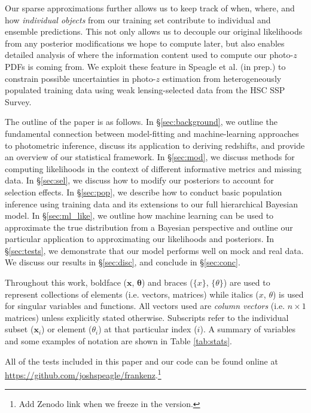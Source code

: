 \documentclass[a4paper,fleqn,usenatbib,english]{mnras}
\newcommand{\pz}{photo-$z$} %
\begin{document}
Our sparse approximations further allows us to keep track of when, where, and how \textit{individual objects} from our training set contribute to individual and ensemble predictions. This not only allows us to decouple our original likelihoods from any posterior modifications we hope to compute later, but also enables detailed analysis of where the information content used to compute our {\pz} PDFs is coming from. We exploit these feature in Speagle et al. (in prep.) to constrain possible uncertainties in {\pz} estimation from heterogeneously populated training data using weak lensing-selected data from the HSC SSP Survey.

The outline of the paper is as follows. In \S\ref{sec:background}, we outline the fundamental connection between model-fitting and machine-learning approaches to photometric inference, discuss its application to deriving redshifts, and provide an overview of our statistical framework. In \S\ref{sec:mod}, we discuss methods for computing likelihoods in the context of different informative metrics and missing data. In \S\ref{sec:sel}, we discuss how to modify our posteriors to account for selection effects. In \S\ref{sec:pop}, we describe how to conduct basic population inference using training data and its extensions to our full hierarchical Bayesian model. In \S\ref{sec:ml_like}, we outline how machine learning can be used to approximate the true distribution from a Bayesian perspective and outline our particular application to approximating our likelihoods and posteriors. In \S\ref{sec:tests}, we demonstrate that our model performs well on mock and real data. We discuss our results in \S\ref{sec:disc}, and conclude in \S\ref{sec:conc}.

Throughout this work, boldface ($\mathbf{x}$, $\boldsymbol{\theta}$) and braces ($\lbrace x \rbrace$, $\lbrace \theta \rbrace$) are used to represent collections of elements (i.e. vectors, matrices) while italics ($x$, $\theta$) is used for singular variables and functions. All vectors used are \textit{column vectors} (i.e. $n \times 1$ matrices) unless explicitly stated otherwise. Subscripts refer to the individual subset ($\mathbf{x}_i$) or element ($\theta_i$) at that particular index ($i$). A summary of variables and some examples of notation are shown in Table \ref{tab:stats}.

All of the tests included in this paper and our code can be found online at \url{https://github.com/joshspeagle/frankenz}.\footnote{Add Zenodo link when we freeze in the version.}
\end{document}
